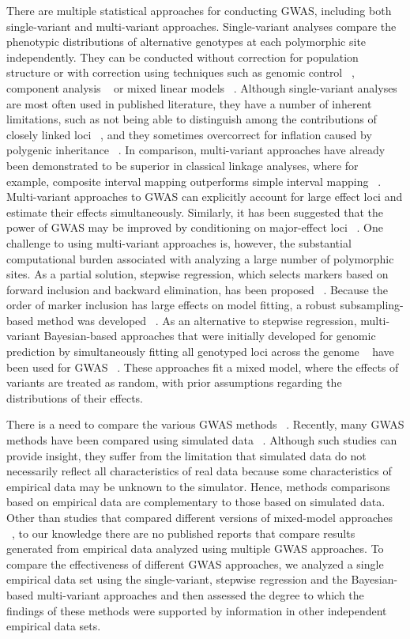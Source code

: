 \documentclass[10pt,letterpaper]{article}
\begin{document}
There are multiple statistical approaches for conducting GWAS, including both single-variant and multi-variant approaches. Single-variant analyses compare the phenotypic distributions of alternative genotypes at each polymorphic site independently. They can be conducted without correction for population structure or with correction using techniques such as genomic control ~\cite{Devlin1999}, \DIFdelbegin {}\DIFdelend \DIFaddbegin {}\DIFaddend component analysis ~\cite{Price2006} or mixed linear models ~\cite{Yu2006}. Although single-variant analyses are most often used in published literature, they have a number of inherent limitations, such as not being able to distinguish among the contributions of closely linked loci ~\cite{Yang2012}, and they sometimes overcorrect for inflation caused by polygenic inheritance ~\cite{Yang2011}. In comparison, multi-variant approaches have already been demonstrated to be superior in classical linkage analyses, where for example, composite interval mapping outperforms simple interval mapping ~\cite{Zeng1993}. Multi-variant approaches to GWAS can explicitly account for large effect loci and estimate their effects simultaneously. Similarly, it has been suggested that the power of GWAS may be improved by conditioning on major-effect loci ~\cite{Kang2010}. One challenge to using multi-variant approaches is, however, the substantial computational burden associated with analyzing a large number of polymorphic sites. As a partial solution, stepwise regression, which selects markers based on forward inclusion and backward elimination, has been proposed ~\cite{Segura2012}. Because the order of marker inclusion has large effects on model fitting, a robust subsampling-based method was developed ~\cite{Valdar2006}. As an alternative to stepwise regression, multi-variant Bayesian-based approaches that were initially developed for genomic prediction by simultaneously fitting all genotyped loci across the genome ~\cite{Meuwissen2001} have been used for GWAS ~\cite{Fan2011, Habier2011}. These approaches fit a mixed model, where the effects of variants are treated as random, with prior assumptions regarding the distributions of their effects. 

There is a need to compare the various GWAS methods ~\cite{Bush2012}.  Recently, many GWAS methods have been compared using simulated data ~\cite{Galesloot2014}. Although such studies can provide insight, they suffer from the limitation that simulated data do not necessarily reflect all characteristics of real data because some characteristics of empirical data may be unknown to the simulator. Hence, methods comparisons based on empirical data are complementary to those based on simulated data. Other than studies that compared different versions of mixed-model approaches ~\cite{stich2008comparison}, to our knowledge there are no published reports that compare results generated from empirical data analyzed using multiple GWAS approaches. To compare the effectiveness of different GWAS approaches, we analyzed a single empirical data set using the single-variant, stepwise regression and the Bayesian-based multi-variant approaches and then assessed the degree to which the findings of these methods were supported by information in other independent empirical data sets.
\end{document}
